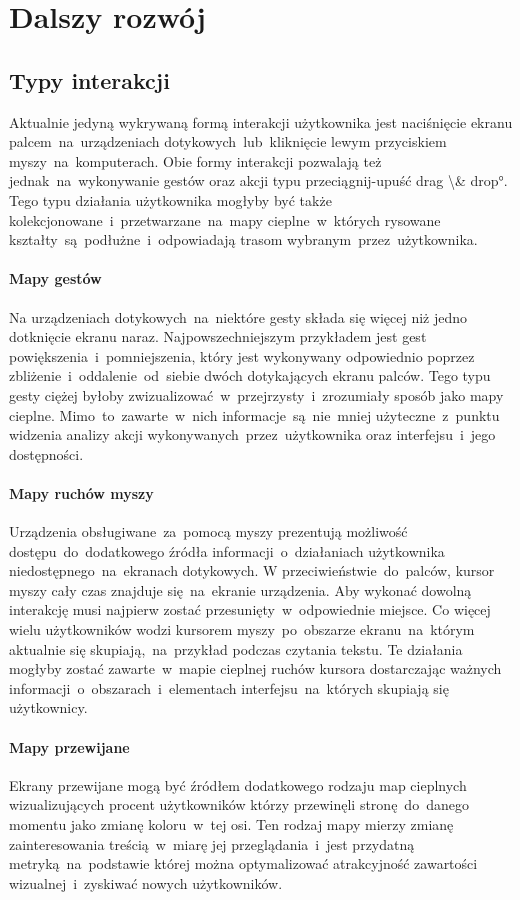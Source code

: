\section{Dalszy rozwój}
\label{sec:future_work}

\subsection{Typy interakcji}
Aktualnie jedyną wykrywaną formą interakcji użytkownika jest naciśnięcie ekranu palcem~na~urządzeniach dotykowych~lub~kliknięcie lewym przyciskiem myszy~na~komputerach. Obie formy interakcji pozwalają też jednak~na~wykonywanie gestów oraz akcji typu przeciągnij-upuść \ang{drag \& drop}. Tego typu działania użytkownika mogłyby być także kolekcjonowane~i~przetwarzane~na~mapy cieplne~w~których rysowane kształty~są~podłużne~i~odpowiadają trasom wybranym~przez~użytkownika.

\paragraph{Mapy gestów} Na urządzeniach dotykowych~na~niektóre gesty składa się więcej niż jedno dotknięcie ekranu naraz. Najpowszechniejszym przykładem jest gest powiększenia~i~pomniejszenia, który jest wykonywany odpowiednio poprzez zbliżenie~i~oddalenie~od~siebie dwóch dotykających ekranu palców. Tego typu gesty ciężej byłoby zwizualizować~w~przejrzysty~i~zrozumiały sposób jako mapy cieplne. Mimo~to~zawarte~w~nich informacje~są~nie~mniej użyteczne~z~punktu widzenia analizy akcji wykonywanych~przez~użytkownika oraz interfejsu~i~jego dostępności.

\paragraph{Mapy ruchów myszy} Urządzenia obsługiwane~za~pomocą myszy prezentują możliwość dostępu~do~dodatkowego źródła informacji~o~działaniach użytkownika niedostępnego~na~ekranach dotykowych. W przeciwieństwie~do~palców, kursor myszy cały czas znajduje się~na~ekranie urządzenia. Aby wykonać dowolną interakcję musi najpierw zostać przesunięty~w~odpowiednie miejsce. Co więcej wielu użytkowników wodzi kursorem myszy~po~obszarze ekranu~na~którym aktualnie się skupiają,~na~przykład podczas czytania tekstu. Te działania mogłyby zostać zawarte~w~mapie cieplnej ruchów kursora dostarczając ważnych informacji~o~obszarach~i~elementach interfejsu~na~których skupiają się użytkownicy.

\paragraph{Mapy przewijane} Ekrany przewijane mogą być źródłem dodatkowego rodzaju map cieplnych wizualizujących procent użytkowników którzy przewinęli stronę~do~danego momentu jako zmianę koloru~w~tej osi. Ten rodzaj mapy mierzy zmianę zainteresowania treścią~w~miarę jej przeglądania~i~jest przydatną metryką~na~podstawie której można optymalizować atrakcyjność zawartości wizualnej~i~zyskiwać nowych użytkowników.

